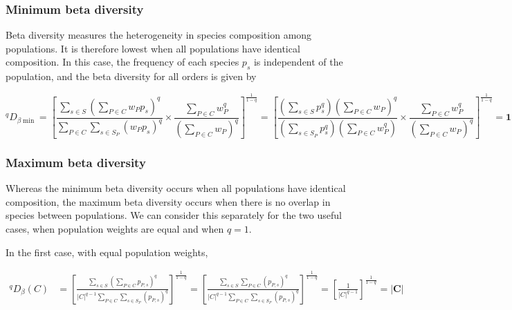 \subsubsection{Minimum beta diversity}

Beta diversity measures the heterogeneity in species composition among populations. It is therefore lowest when all populations have identical composition. In this case, the frequency of each species $p_s$ is independent of the population, and the beta diversity for all orders is given by

\begin{equation}
^qD_{\beta\min} = \left[
\frac{\displaystyle\sum_{s \in S}\left(\sum_{P \in C} w_Pp_s\right)^q}
{\displaystyle\sum_{P \in C}\sum_{s \in S_P} (w_Pp_s)^q}
\times
\frac{\displaystyle\sum_{P \in C} w_P^q}
{\displaystyle\left(\sum_{P \in C} w_P\right)^q}
\right]^\frac{1}{1-q}
 = \left[\frac{\displaystyle\left(\sum_{s \in S}p_s^q\right)\left(\sum_{P \in C} w_P\right)^q}
{\displaystyle\left(\sum_{s \in S_P} p_s^q\right)\left(\sum_{P \in C}w_P^q\right)}
\times
\frac{\displaystyle\sum_{P \in C} w_P^q}
{\displaystyle\left(\sum_{P \in C} w_P\right)^q}
\right]^\frac{1}{1-q}
= \boldsymbol{1}
\label{eq:diversity_beta_min}
\end{equation} %


\subsubsection{Maximum beta diversity}

Whereas the minimum beta diversity occurs when all populations have identical composition, the maximum beta diversity occurs when there is no overlap in species between populations. We can consider this separately for the two useful cases, when population weights are equal and when $q = 1$. 

In the first case, with equal population weights,

\begin{equation}\begin{split}
^qD_\beta(C) &
= \left[\frac{\displaystyle\sum_{s \in S}\left(\sum_{P \in C} p_{P,s}\right)^q}{\displaystyle |C|^{q-1} \sum_{P \in C}\sum_{s \in S_P} (p_{P,s})^q}\right]^\frac{1}{1-q}
= \left[\frac{\displaystyle\sum_{s \in S}\sum_{P \in C} (p_{P,s})^q}{\displaystyle |C|^{q-1} \sum_{P \in C}\sum_{s \in S_P} (p_{P,s})^q}\right]^\frac{1}{1-q}
= \left[\frac{1}{|C|^{q-1}}\right]^\frac{1}{1-q} = \boldsymbol{|C|}
\end{split}
\label{eq:diversity_beta_even}
\end{equation} %

